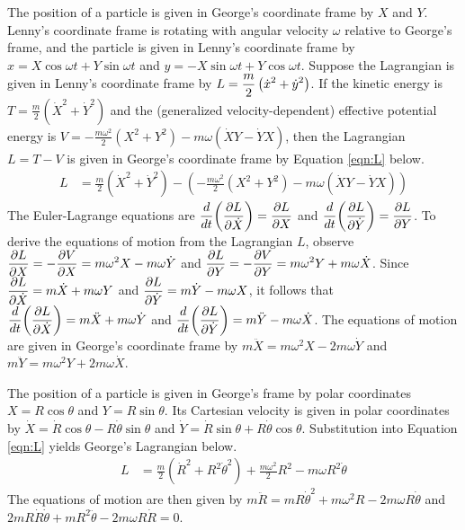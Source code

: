 \begin{answer}
	The position of a particle is given in George's coordinate frame by $X$ and $Y$.
	Lenny's coordinate frame is rotating with angular velocity $\omega$ relative to George's frame, and the particle is given in Lenny's coordinate frame by $x = X \cos \omega t + Y \sin \omega t$ and $y = -X \sin \omega t + Y \cos \omega t$.
	Suppose the Lagrangian is given in Lenny's coordinate frame by $\displaystyle L = \frac{m}{2}\left(\dot{x}^2 + \dot{y}^2\right)$.
	If the kinetic energy is $T = \frac{m}{2}\left(\dot{X}^2 + \dot{Y}^2\right)$ and the (generalized velocity-dependent) effective potential energy is $V = -\frac{m \omega^2}{2}\left(X^2 + Y^2\right) - m \omega \left(\dot{X} Y - \dot{Y} X\right)$, then the Lagrangian $L = T - V$ is given in George's coordinate frame by Equation \eqref{eqn:L} below.
	\begin{align}\label{eqn:L}
		L & =  \frac{m}{2}\left(\dot{X}^2 + \dot{Y}^2\right) - \left(-\frac{m \omega^2}{2}(X^2 + Y^2) - m \omega (\dot{X} Y - \dot{Y} X) \right)
	\end{align}
	The Euler-Lagrange equations are $\displaystyle \frac{d}{dt}\!\left(\frac{\partial L}{\partial \dot{X}}\right) = \frac{\partial L}{\partial X}$ and $\displaystyle \frac{d}{dt}\!\left(\frac{\partial L}{\partial \dot{Y}}\right) = \frac{\partial L}{\partial Y}$.
	To derive the equations of motion from the Lagrangian $L$, observe $\displaystyle \frac{\partial L}{\partial X} = - \frac{\partial V}{\partial X} = m\omega^2 X - m \omega \dot{Y}$ and $\displaystyle \frac{\partial L}{\partial Y} = - \frac{\partial V}{\partial Y} = m \omega^2 Y + m \omega \dot{X}$.
	Since $\displaystyle \frac{\partial L}{\partial \dot{X}} = m \dot{X} + m \omega Y$ and $\displaystyle \frac{\partial L}{\partial \dot{Y}} = m \dot{Y} - m \omega X$, it follows that $\displaystyle \frac{d}{dt}\!\left(\frac{\partial L}{\partial \dot{X}}\right) = m\ddot{X} + m \omega \dot{Y}$ and $\displaystyle \frac{d}{dt}\!\left(\frac{\partial L}{\partial \dot{Y}}\right) = m \ddot{Y} - m \omega \dot{X}$.
	The equations of motion are given in George's coordinate frame by $m\ddot{X} = m \omega^2 X - 2 m \omega \dot{Y}$ and $m \ddot{Y} = m \omega^2 Y + 2 m \omega \dot{X}$.
\end{answer}

\begin{answer}
	The position of a particle is given in George's frame by polar coordinates $X = R \cos \theta$ and $Y = R \sin \theta$.
	Its Cartesian velocity is given in polar coordinates by $\dot{X} = \dot{R} \cos \theta - R \dot{\theta} \sin \theta$ and $\dot{Y} = \dot{R} \sin \theta + R \dot{\theta} \cos \theta$.
	Substitution into Equation \eqref{eqn:L} yields George's Lagrangian below.
	\begin{align}\label{eqn:polarL}
		L & =  \frac{m}{2}\left(\dot{R}^2 + R^2 \dot{\theta}^2\right) + \frac{m \omega^2}{2} R^2 - m \omega R^2 \dot{\theta}
	\end{align}
	The equations of motion are then given by $m \ddot{R} = m R \dot{\theta}^2 + m \omega^2 R - 2 m \omega R \dot{\theta}$ and $2 m R \dot{R} \dot{\theta} + m R^2 \ddot{\theta} - 2 m \omega R \dot{R} = 0$.
\end{answer}


